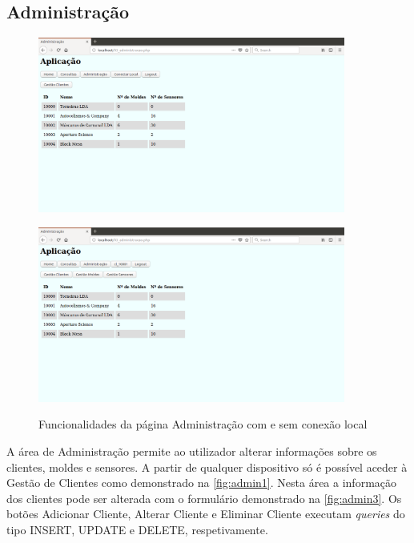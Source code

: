 \documentclass[11pt,twoside,a4paper]{report}
\begin{document}
\subsection{Administração}
\begin{figure}[H]
	\centering
	\begin{minipage}{1\textwidth}
		\begin{center}
			\includegraphics[width=0.9\textwidth]{administracao01} %
			\label{fig:admin1}
		\end{center}
	\end{minipage}
	\begin{minipage}{1\textwidth}
		\begin{center}
			\includegraphics[width=0.9\textwidth]{administracao03} %
			\label{fig:admin2}
		\end{center}
	\end{minipage}
	\caption{Funcionalidades da página Administração com e sem conexão local}
	\label{fig:admin0}
\end{figure}
\newpage
A área de Administração permite ao utilizador alterar informações sobre os clientes, moldes e sensores. A partir de qualquer dispositivo só é possível aceder à Gestão de Clientes como demonstrado na \autoref{fig:admin1}. Nesta área a informação dos clientes pode ser alterada com o formulário demonstrado na \autoref{fig:admin3}. Os botões Adicionar Cliente, Alterar Cliente e Eliminar Cliente executam \textit{queries} do tipo INSERT, UPDATE e DELETE, respetivamente.\\
\end{document}

